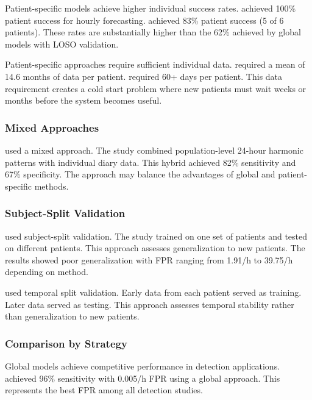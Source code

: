 Patient-specific models achieve higher individual success rates. \textcite{stirlingForecastingSeizureLikelihood2021} achieved 100\% patient success for hourly forecasting. \textcite{nasseriAmbulatorySeizureForecasting2021} achieved 83\% patient success (5 of 6 patients). These rates are substantially higher than the 62\% achieved by global models with LOSO validation.

Patient-specific approaches require sufficient individual data. \textcite{stirlingForecastingSeizureLikelihood2021} required a mean of 14.6 months of data per patient. \textcite{nasseriAmbulatorySeizureForecasting2021} required 60+ days per patient. This data requirement creates a cold start problem where new patients must wait weeks or months before the system becomes useful.

\subsubsection{Mixed Approaches}

\textcite{vielufSeizureMonitoringCombined2025} used a mixed approach. The study combined population-level 24-hour harmonic patterns with individual diary data. This hybrid achieved 82\% sensitivity and 67\% specificity. The approach may balance the advantages of global and patient-specific methods.

\subsubsection{Subject-Split Validation}

\textcite{reintjesECGBasedDetectionEpileptic2025} used subject-split validation. The study trained on one set of patients and tested on different patients. This approach assesses generalization to new patients. The results showed poor generalization with FPR ranging from 1.91/h to 39.75/h depending on method.

\textcite{nasseriAmbulatorySeizureForecasting2021} used temporal split validation. Early data from each patient served as training. Later data served as testing. This approach assesses temporal stability rather than generalization to new patients.

\subsubsection{Comparison by Strategy}

Global models achieve competitive performance in detection applications. \textcite{spahrDeepLearningbasedDetection2025} achieved 96\% sensitivity with 0.005/h FPR using a global approach. This represents the best FPR among all detection studies.

